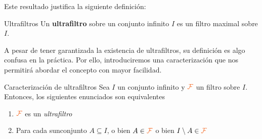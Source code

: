 \documentclass[titlepage,11pt,a4paper]{book}
\newcommand{\filt}{\ensuremath{\textcolor{Orange}{\mathcal{F}}}}
\begin{document}
\medskip
Este resultado justifica la siguiente definición:

\begin{defn*}{Ultrafiltros}
    Un \textbf{ultrafiltro} sobre un conjunto infinito $I$ es un filtro maximal sobre $I$.
\end{defn*}

\smallskip
A pesar de tener garantizada la existencia de ultrafiltros, su definición es algo confusa en la práctica. Por ello, introduciremos una caracterización que nos permitirá abordar el concepto con mayor facilidad.

\begin{prop*}{Caracterización de ultrafiltros}
    Sea $I$ un conjunto infinito y $\filt$ un filtro sobre $I$. Entonces, los siguientes enunciados son equivalentes
     \begin{enumerate}
        \item[(1)] $\filt$ es un \textit{ultrafiltro}
        \item[(2)] Para cada sunconjunto $A \subseteq I$, o bien $A \in \filt$ o bien $I \setminus A \in \filt$
     \end{enumerate}
\end{prop*}
\end{document}
